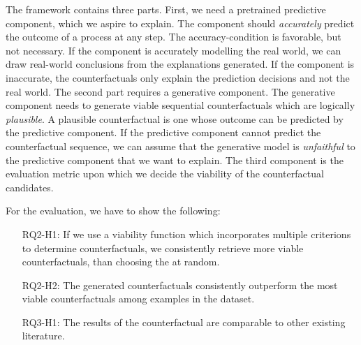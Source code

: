 \documentclass[./../../paper.tex]{subfiles}
\begin{document}
\noindent The framework contains three parts. First, we need a pretrained predictive component, which we aspire to explain. The component should \emph{accurately} predict the outcome of a process at any step. The accuracy-condition is favorable, but not necessary. If the component is accurately modelling the real world, we can draw real-world conclusions from the explanations generated. If the component is inaccurate, the counterfactuals only explain the prediction decisions and not the real world. The second part requires a generative component. The generative component needs to generate viable sequential counterfactuals which are logically \emph{plausible}. A plausible counterfactual is one whose outcome can be  predicted by the predictive component. If the predictive component cannot predict the counterfactual sequence, we can assume that the generative model is \emph{unfaithful} to the predictive component that we want to explain. The third component is the evaluation metric upon which we decide the viability of the counterfactual candidates.

For the evaluation, we have to show the following:
\begin{itemize}
    \item[RQ2-H1:] If we use a viability function which incorporates multiple criterions to determine counterfactuals, we consistently retrieve more viable counterfactuals, than choosing the at random.
    \item[RQ2-H2:] The generated counterfactuals consistently outperform the most viable counterfactuals among examples in the dataset.
    \item[RQ3-H1:] The results of the counterfactual are comparable to other existing literature.
\end{itemize}
\end{document}
